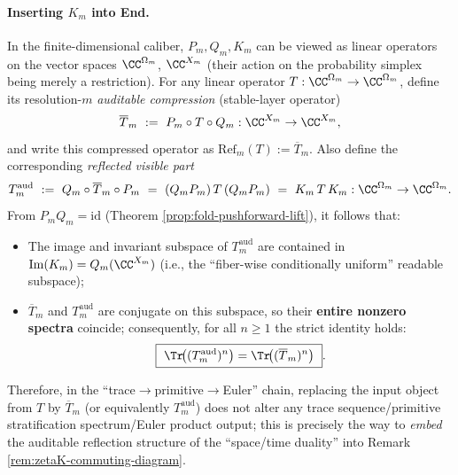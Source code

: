 \begin{remark}
\paragraph{Inserting \(K_m\) into End.}
In the finite-dimensional caliber, \(P_m,Q_m,K_m\) can be viewed as linear operators on the vector spaces \(\CC^{\Omega_m}\), \(\CC^{X_m}\) (their action on the probability simplex being merely a restriction).
For any linear operator \(T:\CC^{\Omega_m}\to\CC^{\Omega_m}\), define its resolution-\(m\) \emph{auditable compression} (stable-layer operator)
\[
\overline T_m\ :=\ P_m\circ T\circ Q_m:\CC^{X_m}\to\CC^{X_m},
\]
and write this compressed operator as \(\mathrm{Ref}_m(T):=\overline T_m\).
Also define the corresponding \emph{reflected visible part}
\[
T_m^{\mathrm{aud}}\ :=\ Q_m\circ \overline T_m\circ P_m
\ =\ (Q_mP_m)\,T\,(Q_mP_m)
\ =\ K_m\,T\,K_m:\CC^{\Omega_m}\to\CC^{\Omega_m}.
\]
From \(P_mQ_m=\mathrm{id}\) (Theorem \ref{prop:fold-pushforward-lift}), it follows that:
\begin{itemize}
  \item The image and invariant subspace of \(T_m^{\mathrm{aud}}\) are contained in \(\mathrm{Im}(K_m)=Q_m(\CC^{X_m})\) (i.e., the ``fiber-wise conditionally uniform'' readable subspace);
  \item \(\overline T_m\) and \(T_m^{\mathrm{aud}}\) are conjugate on this subspace, so their \textbf{entire nonzero spectra} coincide; consequently, for all \(n\ge 1\) the strict identity holds:
  \[
  \boxed{\ \Tr\!\bigl((T_m^{\mathrm{aud}})^n\bigr)=\Tr\!\bigl((\overline T_m)^n\bigr)\ }.
  \]
\end{itemize}
Therefore, in the ``trace$\to$primitive$\to$Euler'' chain, replacing the input object from \(T\) by \(\overline T_m\) (or equivalently \(T_m^{\mathrm{aud}}\)) does not alter any trace sequence/primitive stratification spectrum/Euler product output; this is precisely the way to \emph{embed} the auditable reflection structure of the ``space/time duality'' into Remark \ref{rem:zetaK-commuting-diagram}.


\end{remark}
